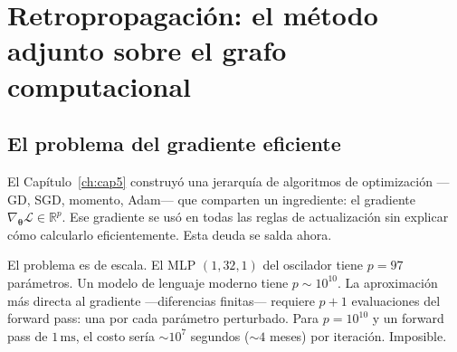 
\chapter{Retropropagación: el método adjunto sobre el grafo computacional}
\label{ch:cap6}

\section{El problema del gradiente eficiente}
\label{sec:prob_grad}


El Capítulo~\ref{ch:cap5} construyó una jerarquía de algoritmos de
optimización —GD, SGD, momento, Adam— que comparten un ingrediente: el
gradiente $\nabla_{\bm{\theta}}\mathcal{L} \in \mathbb{R}^p$. Ese
gradiente se usó en todas las reglas de actualización sin explicar cómo
calcularlo eficientemente. Esta deuda se salda ahora.

El problema es de escala. El MLP $(1, 32, 1)$ del oscilador tiene
$p = 97$ parámetros. Un modelo de lenguaje moderno tiene $p \sim 10^{10}$.
La aproximación más directa al gradiente —diferencias finitas— requiere
$p + 1$ evaluaciones del forward pass: una por cada parámetro perturbado.
Para $p = 10^{10}$ y un forward pass de $1\,\text{ms}$, el costo sería
$\sim 10^7$ segundos ($\sim 4$ meses) por iteración. Imposible.

